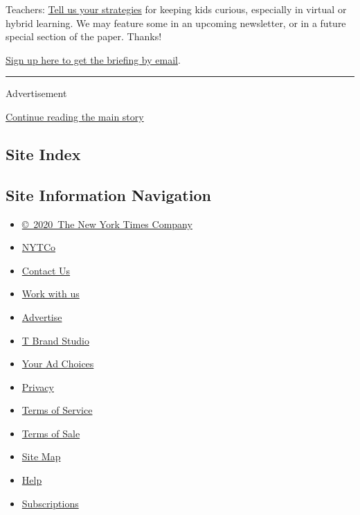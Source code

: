 Teachers:
\href{https://www.nytimes3xbfgragh.onion/2020/09/09/us/how-are-you-keeping-your-students-engaged.html}{Tell
us your strategies} for keeping kids curious, especially in virtual or
hybrid learning. We may feature some in an upcoming newsletter, or in a
future special section of the paper. Thanks!

\href{https://www.nytimes3xbfgragh.onion/newsletters/coronavirus-schools-briefing}{Sign
up here to get the briefing by email}.

\begin{center}\rule{0.5\linewidth}{\linethickness}\end{center}

Advertisement

\protect\hyperlink{after-bottom}{Continue reading the main story}

\hypertarget{site-index}{%
\subsection{Site Index}\label{site-index}}

\hypertarget{site-information-navigation}{%
\subsection{Site Information
Navigation}\label{site-information-navigation}}

\begin{itemize}
\tightlist
\item
  \href{https://help.nytimes3xbfgragh.onion/hc/en-us/articles/115014792127-Copyright-notice}{©~2020~The
  New York Times Company}
\end{itemize}

\begin{itemize}
\tightlist
\item
  \href{https://www.nytco.com/}{NYTCo}
\item
  \href{https://help.nytimes3xbfgragh.onion/hc/en-us/articles/115015385887-Contact-Us}{Contact
  Us}
\item
  \href{https://www.nytco.com/careers/}{Work with us}
\item
  \href{https://nytmediakit.com/}{Advertise}
\item
  \href{http://www.tbrandstudio.com/}{T Brand Studio}
\item
  \href{https://www.nytimes3xbfgragh.onion/privacy/cookie-policy\#how-do-i-manage-trackers}{Your
  Ad Choices}
\item
  \href{https://www.nytimes3xbfgragh.onion/privacy}{Privacy}
\item
  \href{https://help.nytimes3xbfgragh.onion/hc/en-us/articles/115014893428-Terms-of-service}{Terms
  of Service}
\item
  \href{https://help.nytimes3xbfgragh.onion/hc/en-us/articles/115014893968-Terms-of-sale}{Terms
  of Sale}
\item
  \href{https://spiderbites.nytimes3xbfgragh.onion}{Site Map}
\item
  \href{https://help.nytimes3xbfgragh.onion/hc/en-us}{Help}
\item
  \href{https://www.nytimes3xbfgragh.onion/subscription?campaignId=37WXW}{Subscriptions}
\end{itemize}
